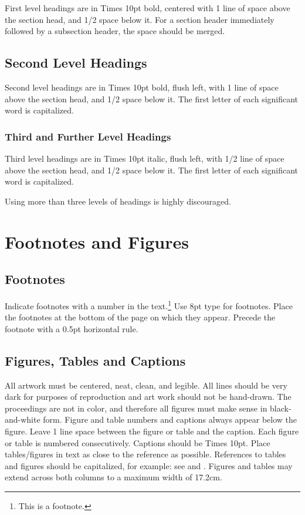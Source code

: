 \documentclass{article}
\begin{document}
First level headings are in Times 10pt bold,
centered with 1 line of space above the section head, and 1/2 space below it.
For a section header immediately followed by a subsection header, the space should be merged.

\subsection{Second Level Headings}

Second level headings are in Times 10pt bold, flush left,
with 1 line of space above the section head, and 1/2 space below it.
The first letter of each significant word is capitalized.

\subsubsection{Third and Further Level Headings}

Third level headings are in Times 10pt italic, flush left,
with 1/2 line of space above the section head, and 1/2 space below it.
The first letter of each significant word is capitalized.

Using more than three levels of headings is highly discouraged.

\section{Footnotes and Figures}

\subsection{Footnotes}

Indicate footnotes with a number in the text.\footnote{This is a footnote.}
Use 8pt type for footnotes. Place the footnotes at the bottom of the page on which they appear.
Precede the footnote with a 0.5pt horizontal rule.

\subsection{Figures, Tables and Captions}

All artwork must be centered, neat, clean, and legible.
All lines should be very dark for purposes of reproduction and art work should not be hand-drawn.
The proceedings are not in color, and therefore all figures must make sense in black-and-white form.
Figure and table numbers and captions always appear below the figure.
Leave 1 line space between the figure or table and the caption.
Each figure or table is numbered consecutively. Captions should be Times 10pt.
Place tables/figures in text as close to the reference as possible.
References to tables and figures should be capitalized, for example:
see  and .
Figures and tables may extend across both columns to a maximum width of 17.2cm.
\end{document}
